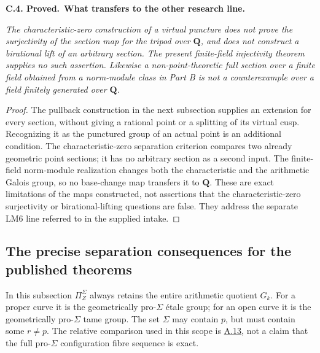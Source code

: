 \documentclass[11pt,a4paper]{article}
\newenvironment{claim}[3]{\par\medskip\noindent\hypertarget{#1}{\textbf{#1. #2.}}\ \textbf{#3.}\par\nopagebreak\smallskip\begingroup\itshape}{\endgroup\par\smallskip}
\newcommand{\statementref}[1]{\hyperlink{#1}{#1}}
\begin{document}
\begin{claim}{C.4}{Proved}{What transfers to the other research line}
The characteristic-zero construction of a virtual puncture
does not prove the surjectivity of the section map for the
tripod over $\mathbf Q$, and does not construct a birational
lift of an arbitrary section. The present finite-field
injectivity theorem supplies no such assertion. Likewise a
non-point-theoretic full section over a finite field obtained
from a norm-module class in Part B is not a counterexample
over a field finitely generated over $\mathbf Q$.
\end{claim}
\begin{proof}
The pullback construction in the next subsection supplies an
extension for every section, without giving a rational point or
a splitting of its virtual cusp. Recognizing it as the punctured
group of an actual point is an additional condition. The
characteristic-zero separation criterion compares two already
geometric point sections; it has no arbitrary section as a
second input. The finite-field norm-module realization changes
both the characteristic and the arithmetic Galois group, so no
base-change map transfers it to $\mathbf Q$. These are exact
limitations of the maps constructed, not assertions that the
characteristic-zero surjectivity or birational-lifting questions
are false. They address the separate LM6 line referred to in
the supplied intake.
\end{proof}



\subsection{The precise separation consequences for the published theorems}

In this subsection $\Pi_Z^\Sigma$ always retains the entire arithmetic
quotient $G_k$. For a proper curve it is the geometrically pro-$\Sigma$
\'etale group; for an open curve it is the geometrically pro-$\Sigma$
tame group. The set $\Sigma$ may contain $p$, but must contain some
$r\ne p$. The relative comparison used in this scope is
\statementref{A.13}, not a claim that the full pro-$\Sigma$
configuration fibre sequence is exact.
\end{document}
